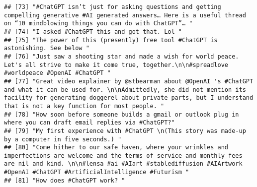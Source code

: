 \documentclass[
]{article}
\begin{document}
\begin{verbatim}
## [73] "#ChatGPT isn’t just for asking questions and getting compelling generative #AI generated answers… Here is a useful thread on “10 mindblowing things you can do with ChatGPT”… "                                                                                                                                
## [74] "I asked #ChatGPT this and got that. Lol "                                                                                                                                                                                                                                                                      
## [75] "The power of this (presently) free tool #ChatGPT is astonishing. See below "                                                                                                                                                                                                                                   
## [76] "Just saw a shooting star and made a wish for world peace. Let's all strive to make it come true, together.\n\n#spreadlove #worldpeace #OpenAI #ChatGPT "                                                                                                                                                       
## [77] "Great video explainer by @stbearman about @OpenAI 's #ChatGPT and what it can be used for. \n\nAdmittedly, she did not mention its facility for generating doggerel about private parts, but I understand that is not a key function for most people. "                                                        
## [78] "How soon before someone builds a gmail or outlook plug in where you can draft email replies via #ChatGPT?"                                                                                                                                                                                                     
## [79] "My first experience with #ChatGPT \n(This story was made-up by a computer in five seconds.) "                                                                                                                                                                                                                  
## [80] "Come hither to our safe haven, where your wrinkles and imperfections are welcome and the terms of service and monthly fees are nil and kind. \n\n#lensa #ai #AIart #stablediffusion #AIArtwork #OpenAI #ChatGPT #ArtificialIntelligence #Futurism "                                                            
## [81] "How does #ChatGPT work? "                                                                                                                                                                                                                                                                                      

\end{verbatim}
\end{document}
